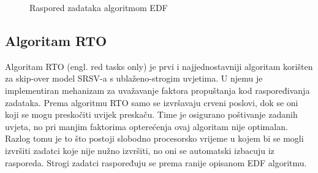 \documentclass[../zavrsni.tex]{subfiles}
\begin{document}
\begin{figure}[h!]
    \centering

    \begin{RTGrid}[width=13cm]{3}{24}

  

  

  

    \end{RTGrid}

    \caption{Raspored zadataka algoritmom EDF}
    \label{fig:ex1}
  \end{figure}

\subsection{Algoritam RTO}

Algoritam RTO (engl. red tasks only) je prvi i najjednostavniji algoritam korišten za skip-over model SRSV-a s ublaženo-strogim uvjetima.
U njemu je implementiran mehanizam za uvažavanje faktora propuštanja kod raspoređivanja zadataka.
Prema algoritmu RTO samo se izvršavaju crveni poslovi, dok se oni koji se mogu preskočiti uvijek preskaču. 
Time je osigurano poštivanje zadanih uvjeta, no pri manjim 
faktorima opterećenja ovaj algoritam nije optimalan. Razlog tomu je to što postoji slobodno procesorsko vrijeme u kojem bi se mogli 
izvršiti zadatci koje nije nužno izvršiti, no oni se automatski izbacuju iz rasporeda. Strogi zadatci raspoređuju se prema 
ranije opisanom EDF algoritmu. 
\end{document}
